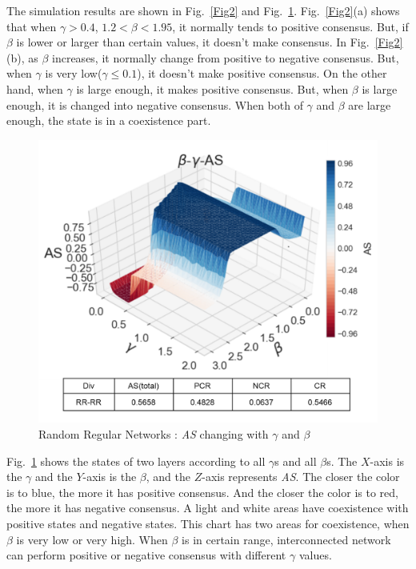 \documentclass[english]{cccconf}
\begin{document}
The simulation results are shown in Fig.~\ref{Fig2} and Fig.~\ref{Fig3}. Fig.~\ref{Fig2}(a) shows that when $\gamma > 0.4$, $1.2 < \beta < 1.95$, it normally tends to positive consensus. But, if $\beta$ is lower or larger than certain values, it doesn't make consensus.
In Fig.~\ref{Fig2}(b), as $\beta$ increases, it normally change from positive to negative consensus. But, when $\gamma$ is very low($\gamma \le 0.1$), it doesn't make positive consensus. On the other hand, when $\gamma$ is large enough, it makes positive consensus. But, when $\beta$ is large enough, it is changed into negative consensus. When both of $\gamma$ and $\beta$ are large enough, the state is in a coexistence part.
 
\begin{figure}[!htb]
	\centering
	\includegraphics[width=\hsize]{FIG3.png}
	\caption{Random Regular Networks : \textit{AS} changing with $\gamma$ and $\beta$}
	\label{Fig3}
\end{figure}

Fig.~\ref{Fig3} shows the states of two layers according to all $\gamma$s and all $\beta$s. The $X$-axis is the $\gamma$ and the $Y$-axis is the $\beta$, and the $Z$-axis represents \textit{AS}. The closer the color is to blue, the more it has positive consensus. And the closer the color is to red, the more it has negative consensus. A light and white areas have coexistence with positive states and negative states. This chart has two areas for coexistence, when $\beta$ is very low or very high. When $\beta$ is in certain range, interconnected network can perform positive or negative consensus with different $\gamma$ values.     
\end{document}
